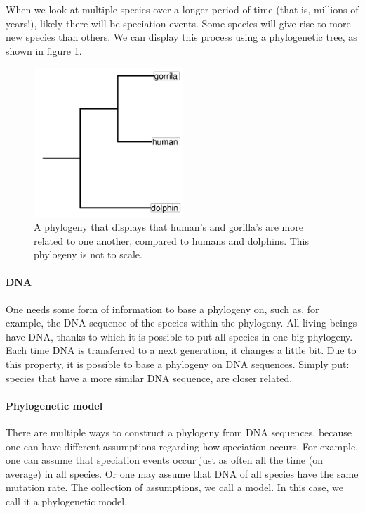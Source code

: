 When we look at multiple species over a longer period of 
time (that is, millions of years!), likely there will be speciation
events. Some species will give rise to more new species than others.
We can display this process using a phylogenetic tree, as shown
in figure \ref{fig:summary_phylogeny}.

\begin{figure}
  \centering
  \includegraphics[width=0.5\textwidth]{summary_phylogeny.png}
  \caption{
    A phylogeny that displays that human's and gorilla's
    are more related to one another, compared to
    humans and dolphins.
    This phylogeny is not to scale.
  }
  \label{fig:summary_phylogeny}
\end{figure}

\paragraph{DNA}

One needs some form of information to base a phylogeny on,
such as, for example, the DNA sequence of the species
within the phylogeny.
All living beings have DNA, thanks to which it is possible 
to put all species in one big phylogeny.
Each time DNA is transferred to a next generation, it
changes a little bit.
Due to this property, it is possible to base a phylogeny
on DNA sequences.
Simply put: species that have a more similar DNA sequence, are
closer related.

\paragraph{Phylogenetic model}

There are multiple ways to construct a phylogeny
from DNA sequences, because one can have different 
assumptions regarding how speciation occurs.
For example, one can assume that speciation events
occur just as often all the time (on average) in all species.
Or one may assume that DNA of all species have the same mutation rate.
The collection of assumptions, we call a model. In this case,
we call it a phylogenetic model.

